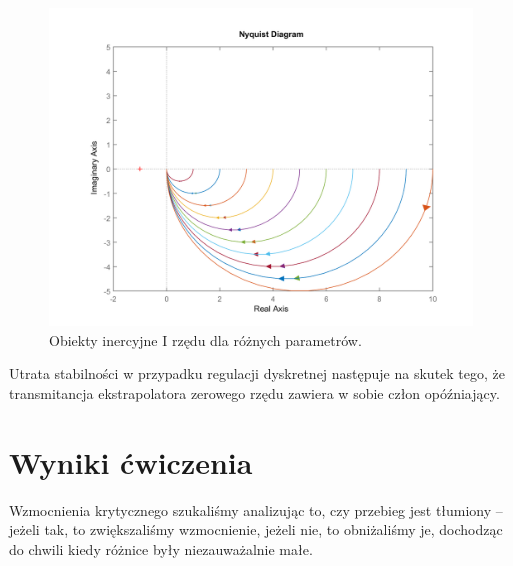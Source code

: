\documentclass[a4paper, 12pt]{article}
\begin{document}
		\begin{figure}[H]
			\centering
			\includegraphics[width = \textwidth]{./img/uzasadnienie_jeden.png}
			\caption{Obiekty inercyjne I rzędu dla różnych parametrów.}
		\end{figure}
		\noindent Utrata stabilności w przypadku regulacji dyskretnej następuje na skutek tego, że transmitancja ekstrapolatora zerowego rzędu zawiera w sobie człon opóźniający.
	\section{Wyniki ćwiczenia}
		Wzmocnienia krytycznego szukaliśmy analizując to, czy przebieg jest tłumiony -- jeżeli tak, to zwiększaliśmy wzmocnienie, jeżeli nie, to obniżaliśmy je, dochodząc do chwili kiedy różnice były niezauważalnie małe.
\end{document}
